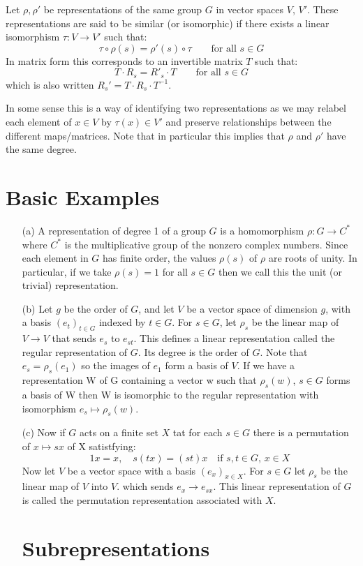 \documentclass[12pt]{article}
\begin{document}
\begin{definition}
    Let $\rho, \rho'$ be representations of the same group $G$ in vector spaces
    $V$, $V'$. These representations are said to be similar (or isomorphic) if there exists
    a linear isomorphism $\tau: V \to V'$ such that:
    \[ \tau \circ \rho(s) = \rho'(s) \circ \tau \qquad \text{for all $s \in G$} \]
    In matrix form this corresponds to an invertible matrix  $T$ such that:
    \[ T \cdot R_s = R'_s \cdot T \qquad \text{for all $s \in G$} \]
    which is also written $R_s' = T \cdot R_s \cdot T^{-1}$.
\end{definition}
In some sense this is a way of identifying two representations as we may relabel
each element of $x \in V$ by $\tau(x) \in V'$ and preserve relationships between the different
maps/matrices. Note that in particular this implies that $\rho$ and $\rho'$ have the same degree.

\section{Basic Examples}
\begin{enumerate}
    \item[(a)] A representation of degree 1 of a group $G$ is a homomorphism $\rho: G \to C^{*}$
    where $C^{*}$ is the multiplicative group of the nonzero complex numbers. Since each element in $G$
    has finite order, the values $\rho(s)$ of $\rho$ are roots of unity. In particular, if we take $\rho(s) = 1$
    for all $s \in G$ then we call this the unit (or trivial) representation.
    \item[(b)] Let $g$ be the order of $G$, and let $V$ be a vector space of dimension $g$,
    with a basis $(e_t)_{t \in G}$ indexed by $t \in G$. For $s \in G$, let $\rho_s$ be the
    linear map of $V \to V$ that sends $e_s$ to $e_{st}$. This defines a linear representation
    called the regular representation of $G$. Its degree is the order of $G$. Note that $e_s = \rho_s(e_1)$
    so the images of $e_1$ form a basis of $V$. If we have a representation W of G containing
    a vector w such that $\rho_s(w)$, $s \in G$ forms a basis of W then W is isomorphic to the
    regular representation with isomorphism $e_s \mapsto \rho_s(w)$.
    \item[(c)] Now if $G$ acts on a finite set $X$ tat for each $s \in G$ there is a permutation
    of $x \mapsto sx$ of X satistfying:
    \[1x = x, \quad s(tx) = (st)x \quad \text{if } s, t \in G, \, x \in X \]
    Now let $V$ be a vector space with a basis $(e_x)_{x \in X}$. For $s \in G$
    let $\rho_s$ be the linear map of $V$ into $V$. which sends $e_x \to e_{sx}$.
    This linear representation of $G$ is called the permutation representation associated
    with $X$.

\section{Subrepresentations}
\end{enumerate}
\end{document}
